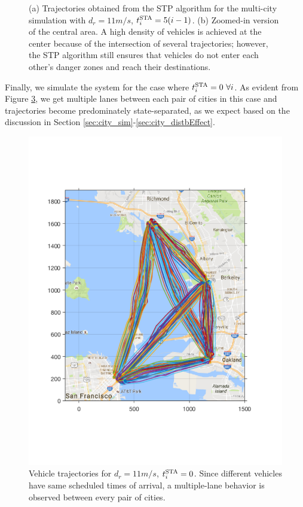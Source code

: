 \begin{figure}[!htb]
\begin{subfigure}{0.5\textwidth}
  \subcaption{}
  \label{fig:bayArea_d11sep5_zoomed}
\end{subfigure}%
  \caption{(a) Trajectories obtained from the STP algorithm for the multi-city simulation with $d_r = 11m/s$, $t^\text{STA}_i = 5(i-1)$. (b) Zoomed-in version of the central area. A high density of vehicles is achieved at the center because of the intersection of several trajectories; however, the STP algorithm still ensures that vehicles do not enter each other's danger zones and reach their destinations.} 
  \label{fig:bayArea_d11sep5_all}
\end{figure}

Finally, we simulate the system for the case where $t^\text{STA}_i = 0 ~\forall i$. As evident from Figure \ref{fig:bayArea_d11sep0}, we get multiple lanes between each pair of cities in this case and trajectories become predominately state-separated, as we expect based on the discussion in Section \ref{sec:city_sim}-\ref{sec:city_distbEffect}.
\begin{figure}[t]
  \centering
  \includegraphics[width=\columnwidth]{figs/bayArea_d11sep0}
  \caption{Vehicle trajectories for $d_r = 11m/s$, $t^\text{STA}_i = 0$. Since different vehicles have same scheduled times of arrival, a multiple-lane behavior is observed between every pair of cities.} 
  \label{fig:bayArea_d11sep0}
\end{figure}

